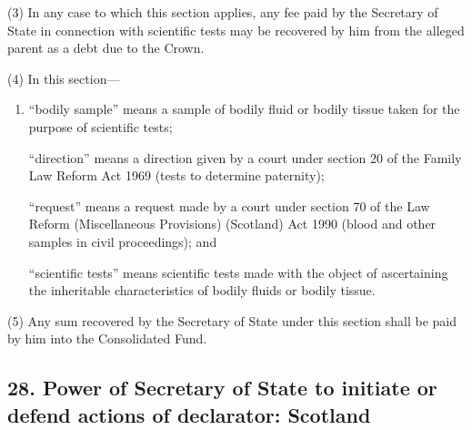 \documentclass[12pt,a4paper]{article}
\begin{document}
(3) In any case to which this section applies, any fee paid by the Secretary of State in connection with scientific tests may be recovered by him from the alleged parent as a debt due to the Crown.

(4) In this section—
\begin{enumerate}\item[]
“bodily sample” means a sample of bodily fluid or bodily tissue taken for the purpose of scientific tests;

“direction” means a direction given by a court under section 20 of the Family Law Reform Act 1969 (tests to determine paternity);

“request” means a request made by a court under section 70 of the Law Reform (Miscellaneous Provisions) (Scotland) Act 1990 (blood and other samples in civil proceedings); and

“scientific tests” means scientific tests made with the object of ascertaining the inheritable characteristics of bodily fluids or bodily tissue.
\end{enumerate}

(5) Any sum recovered by the Secretary of State under this section shall be paid by him into the Consolidated Fund.


\subsection{28. Power of Secretary of State to initiate or defend actions of declarator: Scotland}

%
%
\end{document}
